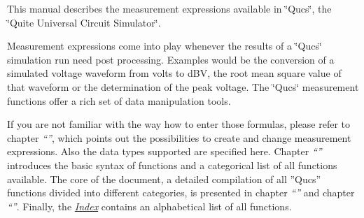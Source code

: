This manual describes the measurement expressions available in
\char`\"{}Qucs\char`\"{}, the \char`\"{}Quite Universal Circuit
Simulator\char`\"{}.

Measurement expressions come into play whenever the results of a
\char`\"{}Qucs\char`\"{} simulation run need post processing. Examples
would be the conversion of a simulated voltage waveform from volts to
dBV, the root mean square value of that waveform or the determination
of the peak voltage. The
\char`\"{}Qucs\char`\"{} measurement functions offer a rich set of
data manipulation tools.

If you are not familiar with the way how to enter those formulas,
please refer to chapter \textit{``''}, which
points out the possibilities to create and change measurement
expressions. Also the data types supported are specified here. Chapter
\textit{``''} introduces the basic syntax of
functions and a categorical list of all functions available. The core
of the document, a detailed compilation of all ''Qucs'' functions
divided into different categories, is presented in chapter
\textit{``''} and chapter
\textit{``''}.  Finally, the
\textit{\hyperlink{chapter:appendix}{Index}} contains an alphabetical list
of all functions.
